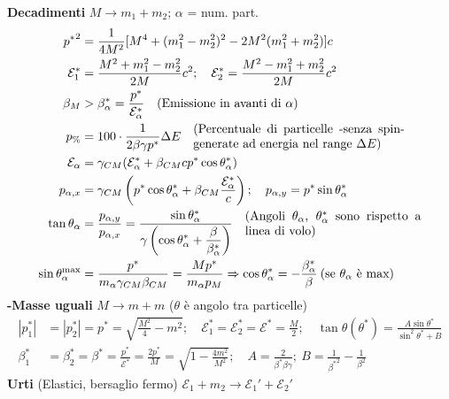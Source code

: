\documentclass{article}
\begin{document}
%
\setlength{\abovedisplayskip}{0pt}%
\setlength{\belowdisplayskip}{0pt}%
\setlength{\abovedisplayshortskip}{0pt}%
\setlength{\belowdisplayshortskip}{0pt}%
\noindent%
\begin{minipage}[t]{.49\textwidth}
\raggedright
{\large\center \textbf{Decadimenti}} $M \to m_1 + m_2$; $\alpha$ = num. part.
\begin{align*}
    {p^*}^2 &= \frac{1}{4M^2}[M^4+(m_1^2-m_2^2)^2-2M^2(m_1^2+m_2^2)]c\\
    \mathcal{E}_1^* &= \frac{M^2+m_1^2-m_2^2}{2M}c^2;\quad \mathcal{E}_2^* = \frac{M^2-m_1^2+m_2^2}{2M}c^2\\
    \beta_M &> \beta_\alpha^* = \frac{p^*}{\mathcal{E}_\alpha^*}\quad \parbox{6cm}{(Emissione in avanti di $\alpha$)} \\
    p_\% &= 100\cdot \frac{1}{2\beta\gamma p^*}\Delta E\quad \parbox{6cm}{(Percentuale di particelle -senza spin- generate ad energia nel range $\Delta E$)}\\
    \mathcal{E}_\alpha &= \gamma_{CM}(\mathcal{E}_\alpha^*+\beta_{CM}c p^*\cos\theta_\alpha^*)\\
    p_{\alpha,x}&=\gamma_{CM}\left (p^*\cos\theta_\alpha^* + \beta_{CM}\frac{\mathcal{E}_\alpha^*}{c} \right ); \quad p_{\alpha,y}=p^*\sin\theta_\alpha^*\\
    \tan\theta_\alpha &= \frac{p_{\alpha,y}}{p_{\alpha,x}}=\frac{\sin\theta_\alpha^*}{\displaystyle \gamma\left (\cos\theta_\alpha^*+\frac{\beta}{\beta_\alpha^*}\right )}\quad \parbox{5cm}{(Angoli $\theta_\alpha$, $\theta_\alpha^*$ sono rispetto a linea di volo)}\\
    \sin\theta_\alpha^{\max}&=\frac{p^*}{m_\alpha\gamma_{CM}\beta_{CM}} = \frac{Mp^*}{m_\alpha p_M} \Rightarrow \cos\theta_\alpha^* = -\frac{\beta_\alpha^*}{\beta}\>\text{(se $\theta_\alpha$ è max)}
\end{align*}
{\center \large \textbf{-Masse uguali}} $M\to m+m$ ($\theta$ è angolo tra particelle)
\begin{align*}
    |p^*_1|&=|p_2^*|=p^*=\sqrt{\frac{M^2}{4}-m^2}; \quad \mathcal{E}_1^* =\mathcal{E}_2^* = \mathcal{E}^* = \frac{M}{2}; \quad \tan\theta(\theta^*) = \frac{A\sin\theta^*}{\sin^2\theta^*+B}\\
    \beta_1^* &= \beta_2^* = \beta^* = \frac{p^*}{\mathcal{E}^*} = \frac{2p^*}{M} = \sqrt{1-\frac{4m^2}{M^2}};\quad  A = \frac{2}{\beta^*\beta\gamma}; \> B= \frac{1}{{\beta^*}^2}-\frac{1}{\beta^2}
\end{align*}
{\center \large \textbf{Urti} (Elastici, bersaglio fermo)} $\mathcal{E}_1 + m_2 \to \mathcal{E}_1' + \mathcal{E}_2'$

\end{minipage}
\end{document}
